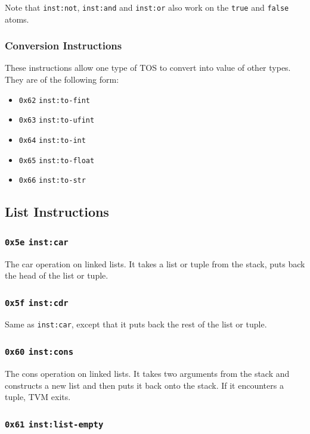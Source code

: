 \documentclass{article}
\newcommand{\inst}[1] {\texttt{inst:#1}}
\begin{document}
Note that \inst{not}, \inst{and} and \inst{or} also work on the \texttt{true} and \texttt{false} atoms.

\subsubsection{Conversion Instructions}

These instructions allow one type of TOS to convert into value of other types. They are of the following form:
\begin{itemize}
\item \texttt{0x62} \inst{to-fint}
\item \texttt{0x63} \inst{to-ufint}
\item \texttt{0x64} \inst{to-int}
\item \texttt{0x65} \inst{to-float}
\item \texttt{0x66} \inst{to-str}
\end{itemize}

\subsection{List Instructions}

\subsubsection{\texttt{0x5e} \inst{car}}

The car operation on linked lists. It takes a list or tuple from the stack, puts back the head of the list or tuple.

\subsubsection{\texttt{0x5f} \inst{cdr}}

Same as \inst{car}, except that it puts back the rest of the list or tuple.

\subsubsection{\texttt{0x60} \inst{cons}}

The cons operation on linked lists. It takes two arguments from the stack and constructs a new list and then puts it back onto the stack. If it encounters a tuple, TVM exits.

\subsubsection{\texttt{0x61} \inst{list-empty}}
\end{document}
